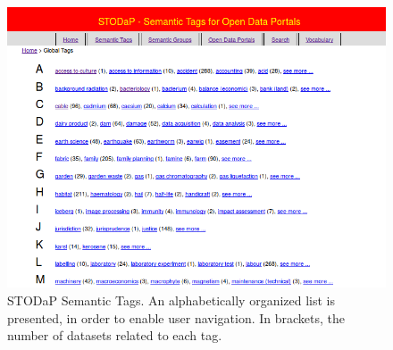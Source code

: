 \begin{figure}[h]
\begin{center}
\includegraphics[width=\columnwidth]{images/stodapscreen_semantictags.png}
\caption[STODaP Semantic Tags.]{STODaP Semantic Tags. An alphabetically organized list is presented, in order to enable user navigation. In brackets, the number of datasets related to each tag.}
\label{fig:stodap_semantictags}
\end{center}
\end{figure}

